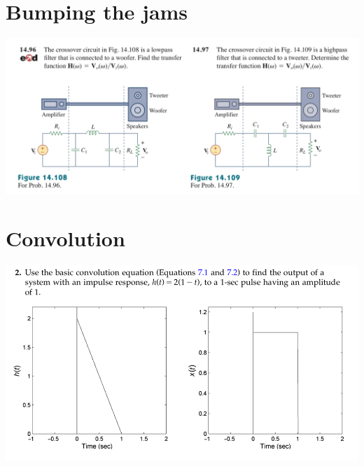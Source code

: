 \documentclass[11pt]{book}
\begin{document}
\section{Bumping the jams}
\begin{center}
	\includegraphics[width=\textwidth]{figures/q3.36.png} 
\end{center}

\newpage

\section{Convolution}
\begin{center}
	\includegraphics[width=\textwidth]{figures/q3.12.png}
\end{center}

\newpage
\end{document}
